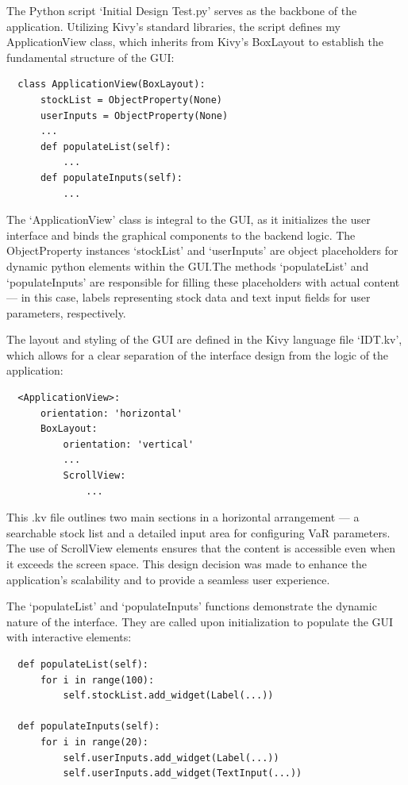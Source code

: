 \documentclass{article}
\begin{document}
The Python script `Initial Design Test.py' serves as the backbone of the application. Utilizing Kivy's standard libraries, the script defines my ApplicationView class, which inherits from Kivy's BoxLayout to establish the fundamental structure of the GUI:

\begin{verbatim}
  class ApplicationView(BoxLayout):
      stockList = ObjectProperty(None)
      userInputs = ObjectProperty(None)
      ...
      def populateList(self):
          ...
      def populateInputs(self):
          ...
\end{verbatim}

The `ApplicationView' class is integral to the GUI, as it initializes the user interface and binds the graphical components to the backend logic. The ObjectProperty instances `stockList' and `userInputs' are object placeholders for dynamic python elements within the GUI.\@ The methods `populateList' and `populateInputs' are responsible for filling these placeholders with actual content — in this case, labels representing stock data and text input fields for user parameters, respectively.\\\vspace{0.3cm}

The layout and styling of the GUI are defined in the Kivy language file `IDT.kv', which allows for a clear separation of the interface design from the logic of the application:

\begin{verbatim}
  <ApplicationView>:
      orientation: 'horizontal'
      BoxLayout:
          orientation: 'vertical'
          ...
          ScrollView:
              ...
\end{verbatim}

This .kv file outlines two main sections in a horizontal arrangement — a searchable stock list and a detailed input area for configuring VaR parameters. The use of ScrollView elements ensures that the content is accessible even when it exceeds the screen space. This design decision was made to enhance the application's scalability and to provide a seamless user experience.\\\vspace{0.3cm}

The `populateList' and `populateInputs' functions demonstrate the dynamic nature of the interface. They are called upon initialization to populate the GUI with interactive elements:

\begin{verbatim}
  def populateList(self):
      for i in range(100):
          self.stockList.add_widget(Label(...))
          
  def populateInputs(self):
      for i in range(20):
          self.userInputs.add_widget(Label(...))
          self.userInputs.add_widget(TextInput(...))
\end{verbatim}
\end{document}
